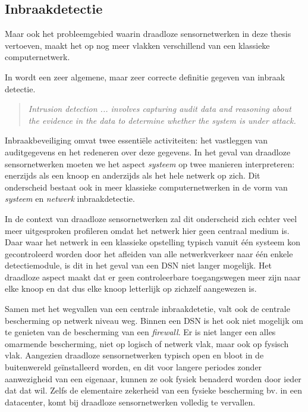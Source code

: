 \subsection{Inbraakdetectie}

Maar ook het probleemgebied waarin draadloze sensornetwerken in deze thesis
vertoeven, maakt het op nog meer vlakken verschillend van een klassieke
computernetwerk.

In \cite{zhang2000intrusion} wordt een zeer algemene, maar zeer correcte
definitie gegeven van inbraak detectie.

\begin{quote}
\emph{Intrusion detection ... involves capturing audit data and reasoning about
the evidence in the data to determine whether the system is under attack.}
\end{quote}

Inbraakbeveiliging omvat twee essenti\"ele activiteiten: het vastleggen van
auditgegevens en het redeneren over deze gegevens. In het geval van draadloze
sensornetwerken moeten we het aspect \emph{systeem} op twee manieren
interpreteren: enerzijds als een knoop en anderzijds als het hele netwerk op
zich. Dit onderscheid bestaat ook in meer klassieke computernetwerken in de
vorm van \emph{systeem} en \emph{netwerk} inbraakdetectie.

In de context van draadloze sensornetwerken zal dit onderscheid zich echter
veel meer uitgesproken profileren omdat het netwerk hier geen centraal medium
is. Daar waar het netwerk in een klassieke opstelling typisch vanuit \'e\'en
systeem kon gecontroleerd worden door het afleiden van alle netwerkverkeer naar
\'e\'en enkele detectiemodule, is dit in het geval van een DSN niet langer
mogelijk. Het draadloze aspect maakt dat er geen controleerbare toegangswegen
meer zijn naar elke knoop en dat dus elke knoop letterlijk op zichzelf
aangewezen is.

Samen met het wegvallen van een centrale inbraakdetetie, valt ook de centrale
bescherming op netwerk niveau weg. Binnen een DSN is het ook niet mogelijk om
te genieten van de bescherming van een \emph{firewall}. Er is niet langer een
alles omarmende bescherming, niet op logisch of netwerk vlak, maar ook op
fysisch vlak. Aangezien draadloze sensornetwerken typisch open en bloot in de
buitenwereld ge\"installeerd worden, en dit voor langere periodes zonder
aanwezigheid van een eigenaar, kunnen ze ook fysiek benaderd worden door ieder
dat dat wil. Zelfs de elementaire zekerheid van een fysieke bescherming bv. in
een datacenter, komt bij draadloze sensornetwerken volledig te vervallen.

